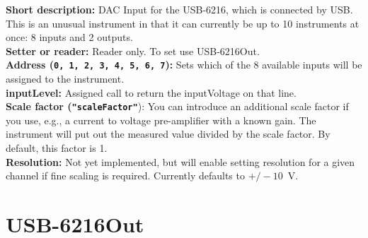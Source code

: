 \textbf{\textsf{Short description}:} DAC Input for the USB-6216, which is connected by USB. This is an unusual instrument in that it can currently be up to 10 instruments at once: 8 inputs and 2 outputs.\\
\textbf{\textsf{Setter or reader}:} Reader only. To set use USB-6216Out.\\
\textbf{\textsf{Address} (\texttt{0, 1, 2, 3, 4, 5, 6, 7}):} Sets which of the 8 available inputs will be assigned to the instrument.\\
\textbf{\textsf{inputLevel}:} Assigned call to return the inputVoltage on that line.\\
\textbf{\textsf{Scale factor} (\texttt{"scaleFactor"}}): You can introduce an additional scale factor if you use, e.g., a current to voltage pre-amplifier with a known gain. The instrument will put out the measured value divided by the scale factor. By default, this factor is 1.\\
\textbf{\textsf{Resolution}:} Not yet implemented, but will enable setting resolution for a given channel if fine scaling is required. Currently defaults to $+/-10$~V.\\

\section{USB-6216Out}

